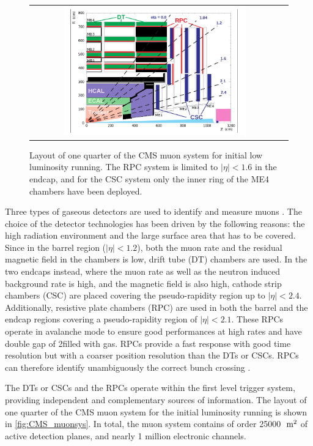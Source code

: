 \begin{figure}[tbh!]
	\centering
	\begin{tabular}{cc}
		\includegraphics[width=0.75\textwidth]{detector/pics/CMS_muonsys.png}
	\end{tabular}
	\caption{Layout of one quarter of the CMS muon system for initial low luminosity running.
		The RPC system is limited to $|\eta| < 1.6$ in the endcap, and for the CSC system only the inner
		ring of the ME4 chambers have been deployed.}
	\label{fig:CMS_muonsys}
\end{figure}

Three types of gaseous detectors are used to identify and measure muons \cite{CMS:1997dma}. The choice of the detector technologies has been driven by the following reasons: the high radiation environment and the large surface area that has to be covered. Since in the barrel region ($|\eta| < 1.2$), both the muon rate and the residual magnetic field in the chambers is low, drift tube (DT) chambers are used. In the two endcaps instead, where the muon rate as well as the neutron induced background rate is high, and the magnetic field is also high, cathode strip chambers (CSC) are placed covering the pseudo-rapidity region up to $|\eta| < 2.4$. Additionally, resistive plate chambers (RPC) are used in both the barrel and the endcap regions covering a pseudo-rapidity region of $|\eta| < 2.1$. These RPCs operate in avalanche mode to ensure good performances at high rates and have double gap of 2\mm filled with gas. RPCs provide a fast response with good time resolution but with a coarser position resolution than the DTs or CSCs. RPCs can therefore identify unambiguously the correct bunch crossing \cite{Chatrchyan:2009hg}.

The DTs or CSCs and the RPCs operate within the first level trigger system, providing independent and complementary sources of information.
The layout of one quarter of the CMS muon system for the initial luminosity running is shown in \autoref{fig:CMS_muonsys}. In total, the muon system contains of order 25000 $\;\text{m}^{2}$ of active detection planes, and nearly 1 million electronic channels.

